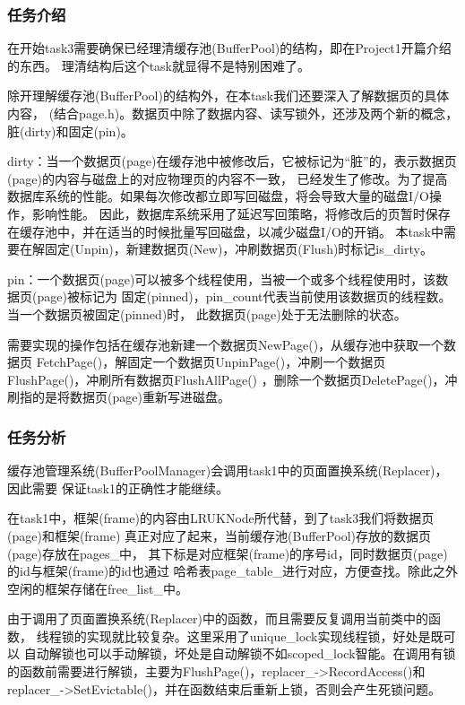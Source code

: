 \documentclass[a4paper]{article}
\begin{document}
\subsubsection{任务介绍}

在开始task3需要确保已经理清缓存池(BufferPool)的结构，即在Project1开篇介绍的东西。
理清结构后这个task就显得不是特别困难了。

除开理解缓存池(BufferPool)的结构外，在本task我们还要深入了解数据页的具体内容，
(结合page.h)。数据页中除了数据内容、读写锁外，还涉及两个新的概念，脏(dirty)和固定(pin)。

dirty：当一个数据页(page)在缓存池中被修改后，它被标记为“脏”的，表示数据页(page)的内容与磁盘上的对应物理页的内容不一致，
已经发生了修改。为了提高数据库系统的性能。如果每次修改都立即写回磁盘，将会导致大量的磁盘I/O操作，影响性能。
因此，数据库系统采用了延迟写回策略，将修改后的页暂时保存在缓存池中，并在适当的时候批量写回磁盘，以减少磁盘I/O的开销。
本task中需要在解固定(Unpin)，新建数据页(New)，冲刷数据页(Flush)时标记is\_dirty。

pin：一个数据页(page)可以被多个线程使用，当被一个或多个线程使用时，该数据页(page)被标记为
固定(pinned)，pin\_count代表当前使用该数据页的线程数。当一个数据页被固定(pinned)时，
此数据页(page)处于无法删除的状态。

需要实现的操作包括在缓存池新建一个数据页NewPage()，从缓存池中获取一个数据页
FetchPage()，解固定一个数据页UnpinPage()，冲刷一个数据页FlushPage()，冲刷所有数据页FlushAllPage()
，删除一个数据页DeletePage()，冲刷指的是将数据页(page)重新写进磁盘。

\subsubsection{任务分析}

缓存池管理系统(BufferPoolManager)会调用task1中的页面置换系统(Replacer)，因此需要
保证task1的正确性才能继续。

在task1中，框架(frame)的内容由LRUKNode所代替，到了task3我们将数据页(page)和框架(frame)
真正对应了起来，当前缓存池(BufferPool)存放的数据页(page)存放在pages\_中，
其下标是对应框架(frame)的序号id，同时数据页(page)的id与框架(frame)的id也通过
哈希表page\_table\_进行对应，方便查找。除此之外空闲的框架存储在free\_list\_中。

由于调用了页面置换系统(Replacer)中的函数，而且需要反复调用当前类中的函数，
线程锁的实现就比较复杂。这里采用了unique\_lock实现线程锁，好处是既可以
自动解锁也可以手动解锁，坏处是自动解锁不如scoped\_lock智能。在调用有锁
的函数前需要进行解锁，主要为FlushPage()，replacer\_->RecordAccess()和
replacer\_->SetEvictable()，并在函数结束后重新上锁，否则会产生死锁问题。
\end{document}
